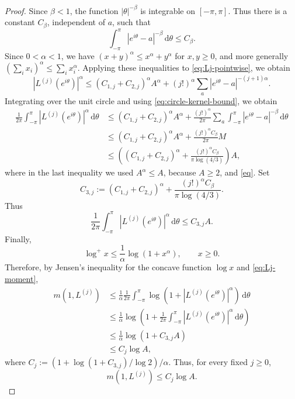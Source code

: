 \documentclass[12pt,letterpaper,reqno]{amsart}
\theoremstyle{definition}
\numberwithin{equation}{section}
\begin{document}
\begin{proof}
Since \(\beta<1\), the function \(|\theta|^{-\beta}\) is integrable on
\([-\pi,\pi]\). Thus there is a constant \(C_\beta\), independent of
\(a\), such that
\begin{equation}\label{eq:circle-kernel-bound}
\int_{-\pi}^{\pi}|e^{i\theta}-a|^{-\beta}\,\mathrm d\theta
\le C_\beta.
\end{equation}
Since \(0<\alpha<1\), we have
$
(x+y)^\alpha\le x^\alpha+y^\alpha
$
for \(x,y\ge0\), and more generally
$
(\sum_i x_i)^\alpha\le\sum_i x_i^\alpha.
$
Applying these inequalities to \eqref{eq:Lj-pointwise}, we obtain
$$
|L^{(j)}(e^{i\theta})|^\alpha
\le
(C_{1,j}+C_{2,j})^\alpha A^\alpha
+
(j!)^\alpha\sum_a
|e^{i\theta}-a|^{-(j+1)\alpha}.
$$
Integrating over the unit circle and using \eqref{eq:circle-kernel-bound}, we obtain
$$
\begin{aligned}
\frac1{2\pi}\int_{-\pi}^{\pi}
|L^{(j)}(e^{i\theta})|^\alpha\,\mathrm d\theta
&\le
(C_{1,j}+C_{2,j})^\alpha A^\alpha
+
\frac{(j!)^\alpha}{2\pi}
\sum_a
\int_{-\pi}^{\pi}
|e^{i\theta}-a|^{-\beta}\,\mathrm d\theta\\
&\le
(C_{1,j}+C_{2,j})^\alpha A^\alpha
+
\frac{(j!)^\alpha C_\beta}{2\pi}M\\
&\le
\left(
(C_{1,j}+C_{2,j})^\alpha
+
\frac{(j!)^\alpha C_\beta}{\pi\log(4/3)}
\right)A,
\end{aligned}
$$
where in the last inequality we used \(A^\alpha\le A\), because \(A\ge2\), and
\eqref{eq}. Set
$$
C_{3,j}:=
(C_{1,j}+C_{2,j})^\alpha
+
\frac{(j!)^\alpha C_\beta}{\pi\log(4/3)}.
$$
Thus
\begin{equation}\label{eq:Lj-moment}
\frac1{2\pi}\int_{-\pi}^{\pi}
|L^{(j)}(e^{i\theta})|^\alpha\,\mathrm d\theta
\le C_{3,j}A.
\end{equation}
Finally,
$$
\log^+x
\le
\frac1\alpha\log(1+x^\alpha),
\qquad x\ge0.
$$
Therefore, by Jensen's inequality for the concave function \(\log x\) and
\eqref{eq:Lj-moment},
$$
\begin{aligned}
m(1,L^{(j)})
&\le
\frac1\alpha\frac1{2\pi}
\int_{-\pi}^{\pi}
\log\left(1+|L^{(j)}(e^{i\theta})|^\alpha\right)
\,\mathrm d\theta\\
&\le
\frac1\alpha
\log\left(
1+
\frac1{2\pi}\int_{-\pi}^{\pi}
|L^{(j)}(e^{i\theta})|^\alpha\,\mathrm d\theta
\right)\\
&\le
\frac1\alpha\log(1+C_{3,j}A)\\
&\le
C_j\log A,
\end{aligned}
$$
where
$
C_j:=
\left(
1+{\log(1+C_{3,j})}/{\log2}
\right)/\alpha.
$
Thus, for every fixed \(j\ge0\),
\begin{equation}\label{eq:Lj-proximity}
m(1,L^{(j)})\le C_j\log A.
\end{equation}


\end{proof}
\end{document}
